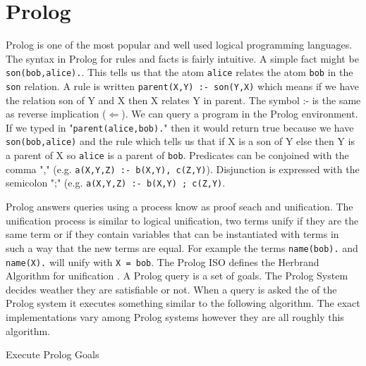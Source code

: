 \section{Prolog}
Prolog is one of the most popular and well used logical programming languages. The syntax in Prolog for rules and facts is fairly intuitive. A simple fact might be \texttt{son(bob,alice).}. This tells us that the atom \texttt{alice} relates the atom \texttt{bob} in the \texttt{son} relation. A rule is written \texttt{parent(X,Y) :- son(Y,X)} which means if we have the relation son of Y and X then X relates Y in parent. The symbol :- is the same as reverse implication ($\Leftarrow$). We can query a program in the Prolog environment. If we typed in "\texttt{parent(alice,bob).}" then it would return true because we have \texttt{son(bob,alice)} and the rule which tells us that if X is a son of Y else then Y is a parent of X so \texttt{alice} is a parent of \texttt{bob}. Predicates can be conjoined with the comma "," (e.g. \texttt{a(X,Y,Z) :- b(X,Y), c(Z,Y)}). Disjunction is expressed with the semicolon ";" (e.g. \texttt{a(X,Y,Z) :- b(X,Y) ; c(Z,Y)}.

Prolog answers queries using a process know as proof seach and unification. The unification process is similar to logical unification, two terms unify if they are the same term or if they contain variables that can be instantiated with terms in such a way that the new terms are equal. For example the terms \texttt{name(bob).} and \texttt{name(X).} will unify with \texttt{X = bob}. The Prolog ISO defines the Herbrand Algorithm for unification \cite{PrologISO}. A Prolog query is a set of goals. The Prolog System decides weather they are satisfiable or not. When a query is asked the of the Prolog system it executes something similar to the following algorithm. The exact implementations vary among Prolog systems however they are all roughly this algorithm.
\begin{algorithm}
\caption{Execute Prolog Goals}
\end{algorithm}

